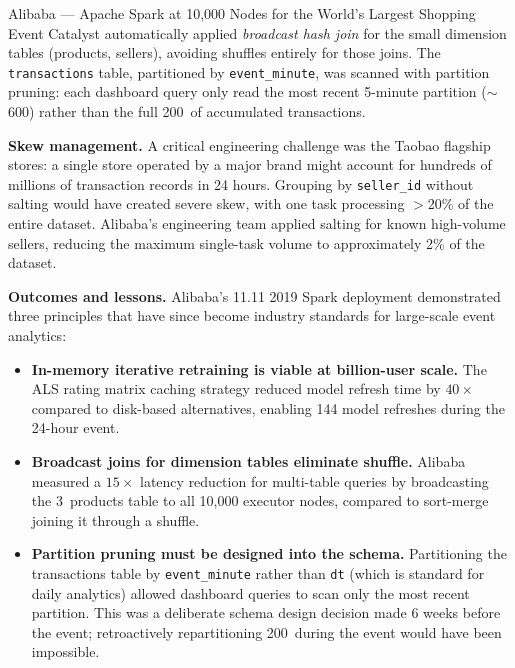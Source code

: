 \begin{casestudy}{Alibaba --- Apache Spark at 10{,}000 Nodes for the World's Largest Shopping Event}
Catalyst automatically applied \emph{broadcast hash join} for the
small dimension tables (products, sellers), avoiding shuffles entirely
for those joins. The \texttt{transactions} table, partitioned by
\texttt{event\_minute}, was scanned with partition pruning: each
dashboard query only read the most recent 5-minute partition
($\sim$600\MB) rather than the full 200\TB\ of accumulated transactions.

\smallskip
\textbf{Skew management.}
A critical engineering challenge was the Taobao flagship stores: a
single store operated by a major brand might account for hundreds of
millions of transaction records in 24 hours. Grouping by
\texttt{seller\_id} without salting would have created severe skew,
with one task processing $>$20\% of the entire dataset. Alibaba's
engineering team applied salting for known high-volume sellers, reducing
the maximum single-task volume to approximately 2\% of the dataset.

\smallskip
\textbf{Outcomes and lessons.}
Alibaba's 11.11 2019 Spark deployment demonstrated three principles
that have since become industry standards for large-scale event analytics:

\begin{itemize}
  \item \textbf{In-memory iterative retraining is viable at billion-user
        scale.} The ALS rating matrix caching strategy reduced model
        refresh time by $40\times$ compared to disk-based alternatives,
        enabling 144 model refreshes during the 24-hour event.
  \item \textbf{Broadcast joins for dimension tables eliminate shuffle.}
        Alibaba measured a $15\times$ latency reduction for multi-table
        queries by broadcasting the 3\GB\ products table to all 10{,}000
        executor nodes, compared to sort-merge joining it through a
        shuffle.
  \item \textbf{Partition pruning must be designed into the schema.}
        Partitioning the transactions table by \texttt{event\_minute}
        rather than \texttt{dt} (which is standard for daily analytics)
        allowed dashboard queries to scan only the most recent partition.
        This was a deliberate schema design decision made 6 weeks before
        the event; retroactively repartitioning 200\TB\ during the event
        would have been impossible.
\end{itemize}
\end{casestudy}

